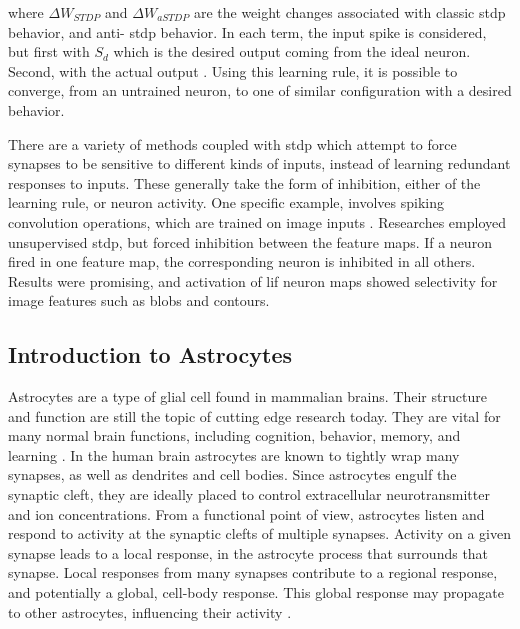 \documentclass[conference]{IEEEtran}
\newcommand{\eq}[1]{Equation (\ref{#1})}
\begin{document}
\noindent where $\Delta W_{STDP}$ and $\Delta W_{aSTDP}$ are the weight changes
associated with classic \gls{stdp} behavior, and anti- \gls{stdp} behavior. In
each term, the input spike is considered, but first with $S_{d}$ which is the
desired output coming from the ideal neuron. Second, with the actual output
\parencite{mozafari_2018}. Using this learning rule, it is possible to converge,
from an untrained neuron, to one of similar configuration with a desired
behavior.


There are a variety of methods coupled with \gls{stdp} which attempt to force
synapses to be sensitive to different kinds of inputs, instead of learning
redundant responses to inputs. These generally take the form of inhibition,
either of the learning rule, or neuron activity. One specific example, involves
spiking convolution operations, which are trained on image inputs
\parencite{delorme_2001}. Researches employed unsupervised \gls{stdp}, but
forced inhibition between the feature maps. If a neuron fired in one feature
map, the corresponding neuron is inhibited in all others. Results were
promising, and activation of \gls{lif} neuron maps showed selectivity for image
features such as blobs and contours.

\subsection{Introduction to Astrocytes}
Astrocytes are a type of glial cell found in mammalian brains. Their
structure and function are still the topic of cutting edge research
today. They are vital for many normal brain functions, including
cognition, behavior, memory, and learning \parencite{mederos_2018}. In the human
brain astrocytes are known to tightly wrap many synapses, as well as dendrites and cell
bodies. Since astrocytes engulf the synaptic cleft, they are ideally
placed to control extracellular neurotransmitter and ion
concentrations. From a functional point of view, astrocytes listen and
respond to activity at the synaptic clefts of multiple synapses. Activity on
a given synapse leads to a local response, in the astrocyte process that
surrounds that synapse. Local responses from many synapses contribute to a
regional response, and potentially a global, cell-body response. This global
response may propagate to other astrocytes, influencing their activity
\parencite{min_2012}.
\end{document}

